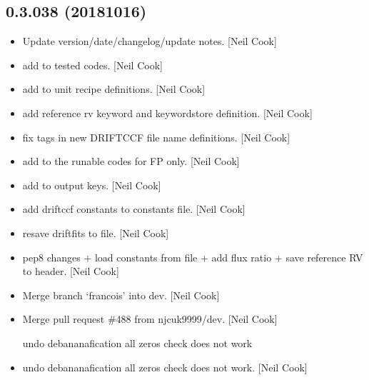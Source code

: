\documentclass[a4paper,10pt,english]{report}
\begin{document}
\subsection{0.3.038 (2018\sphinxhyphen{}10\sphinxhyphen{}16)}
\label{\detokenize{misc/changelog:id310}}\begin{itemize}
\item {} 
Update version/date/changelog/update notes. {[}Neil Cook{]}

\item {} 
 \sphinxhyphen{} add  to tested codes. {[}Neil
Cook{]}

\item {} 
 \sphinxhyphen{} add  to unit recipe
definitions. {[}Neil Cook{]}

\item {} 
 \sphinxhyphen{} add reference rv keyword and keywordstore
definition. {[}Neil Cook{]}

\item {} 
 \sphinxhyphen{} fix tags in new DRIFTCCF file name definitions. {[}Neil
Cook{]}

\item {} 
 \sphinxhyphen{} add  to the runable codes
\sphinxhyphen{} for FP only. {[}Neil Cook{]}

\item {} 
 \sphinxhyphen{} add  to output keys. {[}Neil
Cook{]}

\item {} 
 \sphinxhyphen{} add driftccf constants to constants file.
{[}Neil Cook{]}

\item {} 
 \sphinxhyphen{} re\sphinxhyphen{}save driftfits to file. {[}Neil Cook{]}

\item {} 
 \sphinxhyphen{} pep8 changes + load constants from file
+ add flux ratio + save reference RV to header. {[}Neil Cook{]}

\item {} 
Merge branch ‘francois’ into dev. {[}Neil Cook{]}

\item {} 
Merge pull request \#488 from njcuk9999/dev. {[}Neil Cook{]}

 \sphinxhyphen{} undo debananafication all zeros check \sphinxhyphen{} does not work

\item {} 
 \sphinxhyphen{} undo debananafication all zeros check \sphinxhyphen{} does not
work. {[}Neil Cook{]}

\end{itemize}
\end{document}
